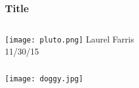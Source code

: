 \documentclass{beamer}
\begin{document}
\begin{frame}
    \frametitle{Title}
    \begin{columns}[c] %
         \texttt{[image: pluto.png]}
         Laurel Farris \\ 11/30/15
    \end{columns}
\end{frame}

\begin{frame}
    \texttt{[image: doggy.jpg]}
\end{frame}
\end{document}
